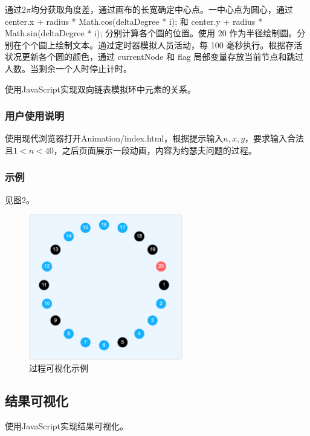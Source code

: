\documentclass{article}
\begin{document}
通过$2\pi$均分获取角度差，通过画布的长宽确定中心点。一中心点为圆心，通过 center.x + radius * Math.cos(deltaDegree * i); 和 center.y + radius * Math.sin(deltaDegree * i); 分别计算各个圆的位置。使用 20 作为半径绘制圆。分别在个个圆上绘制文本。通过定时器模拟人员活动，每 100 毫秒执行。根据存活状况更新各个圆的颜色，通过 currentNode 和 flag 局部变量存放当前节点和跳过人数。当剩余一个人时停止计时。

使用JavaScript实现双向链表模拟环中元素的关系。

\subsubsection{用户使用说明}

使用现代浏览器打开Animation/index.html，根据提示输入$n, x, y$，要求输入合法且$1 < n < 40$，之后页面展示一段动画，内容为约瑟夫问题的过程。

\subsubsection{示例}

见图2。

\begin{figure}[htbp]
    
    \centering\includegraphics[width=0.6\textwidth]{./Images/Animation.png}
    
    \caption{过程可视化示例}
    
\end{figure}

\subsection{结果可视化}

使用JavaScript实现结果可视化。
\end{document}
